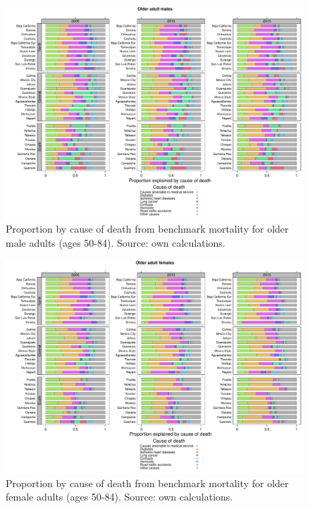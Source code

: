 \documentclass[11.5pt]{article}
\begin{document}
{\begin{figure}
\centering
\caption{Proportion by cause of death from benchmark mortality for older male adults (ages 50-84). Source: own calculations.}
\begin{center}
\includegraphics[scale=.5]{Figures/Figure_prop_oam.pdf}
\end{center}
\end{figure}


\begin{figure}
\centering
\caption{Proportion by cause of death from benchmark mortality for older female adults (ages 50-84). Source: own calculations.}
\begin{center}
\includegraphics[scale=.5]{Figures/Figure_prop_oaf.pdf}
\end{center}
\end{figure}


}
\end{document}
